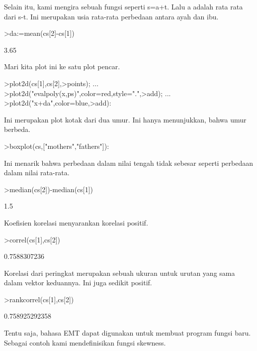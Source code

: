 \documentclass[a4paper,10pt]{article}
\begin{document}
\begin{eulernotebook}
\begin{eulercomment}
Selain itu, kami mengira sebuah fungsi seperti s=a+t. Lalu a adalah
rata rata dari s-t. Ini merupakan usia rata-rata perbedaan antara ayah
dan ibu.
\end{eulercomment}
\begin{eulerprompt}
>da:=mean(cs[2]-cs[1])
\end{eulerprompt}
\begin{euleroutput}
  3.65
\end{euleroutput}
\begin{eulercomment}
Mari kita plot ini ke satu plot pencar.
\end{eulercomment}
\begin{eulerprompt}
>plot2d(cs[1],cs[2],>points);  ...
>plot2d("evalpoly(x,ps)",color=red,style=".",>add);  ...
>plot2d("x+da",color=blue,>add):
\end{eulerprompt}
\begin{eulercomment}
Ini merupakan plot kotak dari dua umur. Ini hanya menunjukkan, bahwa
umur berbeda.
\end{eulercomment}
\begin{eulerprompt}
>boxplot(cs,["mothers","fathers"]):
\end{eulerprompt}
\begin{eulercomment}
Ini menarik bahwa perbedaan dalam nilai tengah tidak sebesar seperti
perbedaan dalam nilai rata-rata.
\end{eulercomment}
\begin{eulerprompt}
>median(cs[2])-median(cs[1])
\end{eulerprompt}
\begin{euleroutput}
  1.5
\end{euleroutput}
\begin{eulercomment}
Koefisien korelasi menyarankan korelasi positif.
\end{eulercomment}
\begin{eulerprompt}
>correl(cs[1],cs[2])
\end{eulerprompt}
\begin{euleroutput}
  0.7588307236
\end{euleroutput}
\begin{eulercomment}
Korelasi dari peringkat merupakan sebuah ukuran untuk urutan yang sama
dalam vektor keduannya. Ini juga sedikit positif.
\end{eulercomment}
\begin{eulerprompt}
>rankcorrel(cs[1],cs[2])
\end{eulerprompt}
\begin{euleroutput}
  0.758925292358
\end{euleroutput}
\begin{eulercomment}
Tentu saja, bahasa EMT dapat digunakan untuk membuat program fungsi
baru. Sebagai contoh kami mendefinisikan fungsi skewness.


\end{eulercomment}
\end{eulernotebook}
\end{document}
